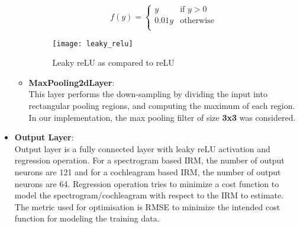 \begin{itemize}
\begin{itemize}
\[
  f(y) =
  \begin{cases}
    	y & \text{if $y>0$} \\
        0.01y & \text{otherwise} \\
  \end{cases}
\]
\begin{figure}[!htbp]
\centering
\texttt{[image: leaky\_relu]}
\caption{Leaky reLU as compared to reLU}
\label{fig:leaky_relu}
\end{figure}
\item \textbf{MaxPooling2dLayer}:\\
This layer performs the down-sampling by dividing the input into rectangular pooling regions, and computing the maximum of each region. In our implementation, the max pooling filter of size \textbf{3x3} was considered.
\end{itemize}
\item \textbf{Output Layer}:\\
Output layer is a fully connected layer with leaky reLU activation and regression operation. For a spectrogram based IRM, the number of output neurons are 121 and for a cochleagram based IRM, the number of output neurons are 64. Regression operation tries to minimize a cost function to model the spectrogram/cochleagram with respect to the IRM to estimate. The metric used for optimisation is RMSE to minimize the intended cost function for modeling the training data.
\end{itemize}
